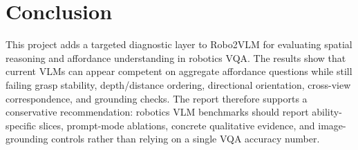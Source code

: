 \section{Conclusion}
\label{sec:conclusion}

This project adds a targeted diagnostic layer to Robo2VLM for evaluating spatial reasoning and affordance understanding in robotics VQA. The results show that current VLMs can appear competent on aggregate affordance questions while still failing grasp stability, depth/distance ordering, directional orientation, cross-view correspondence, and grounding checks. The report therefore supports a conservative recommendation: robotics VLM benchmarks should report ability-specific slices, prompt-mode ablations, concrete qualitative evidence, and image-grounding controls rather than relying on a single VQA accuracy number.
